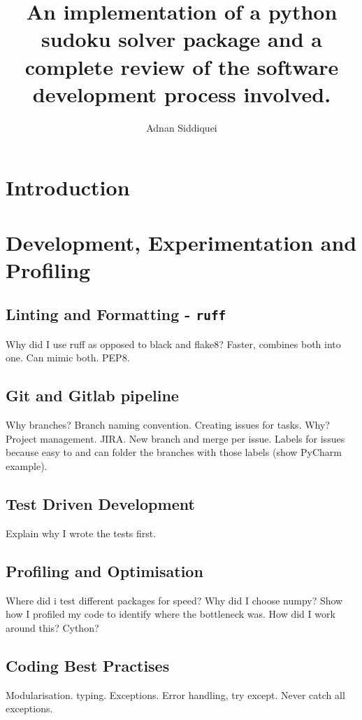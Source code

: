 \documentclass[a4paper,11pt]{article}
\title{\boldmath An implementation of a python sudoku solver package and a complete review of the software development
process involved.}
\author{Adnan Siddiquei}
\affiliation{University of Cambridge}
\newcommand{\inlinecode}[1]{\lstinline{#1}}
\begin{document}
\maketitle
\flushbottom

\section{Introduction}\label{sec:intro}



\section{Development, Experimentation and Profiling}\label{sec:development-experimentation-and-profiling}
\subsection{Linting and Formatting - \inlinecode{ruff}}\label{subsec:linting-and-formatting}
Why did I use ruff as opposed to black and flake8?
Faster, combines both into one. Can mimic both. PEP8.

\subsection{Git and Gitlab pipeline}\label{subsec:git-and-gitlab-pipeline}
Why branches? Branch naming convention.
Creating issues for tasks. Why? Project management. JIRA.
New branch and merge per issue.
Labels for issues because easy to and can folder the branches with those labels (show PyCharm example).

\subsection{Test Driven Development}\label{subsec:test-driven-development}
Explain why I wrote the tests first.

\subsection{Profiling and Optimisation}\label{subsec:profiling-and-optimisation}
Where did i test different packages for speed? Why did I choose numpy?
Show how I profiled my code to identify where the bottleneck was.
How did I work around this? Cython?

\subsection{Coding Best Practises}\label{subsec:coding-best-practises}
Modularisation.
typing.
Exceptions. Error handling, try except. Never catch all exceptions.
\end{document}
